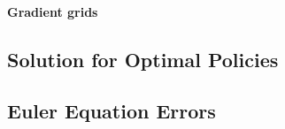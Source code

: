 \paragraph{Gradient grids}

\dummytext[1]{}



\subsection{Solution for Optimal Policies}
\label{sec:827solvePolicy}

\dummytext[1]{}



\subsection{Euler Equation Errors}
\label{sec:828eulerEquationErrors}

\dummytext[1]{}
